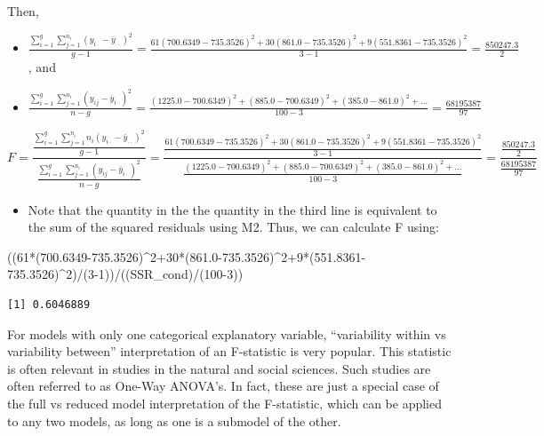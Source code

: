 \documentclass[
  letterpaper,
  DIV=11,
  numbers=noendperiod]{scrreprt}
\newenvironment{Shaded}{\begin{snugshade}}{\end{snugshade}}
\newcommand{\DecValTok}[1]{\textcolor[rgb]{0.68,0.00,0.00}{#1}}
\newcommand{\FloatTok}[1]{\textcolor[rgb]{0.68,0.00,0.00}{#1}}
\newcommand{\NormalTok}[1]{\textcolor[rgb]{0.00,0.23,0.31}{#1}}
\newcommand{\SpecialCharTok}[1]{\textcolor[rgb]{0.37,0.37,0.37}{#1}}
\providecommand{\tightlist}{%
  \setlength{\itemsep}{0pt}\setlength{\parskip}{0pt}}\usepackage{longtable,booktabs,array}
\begin{document}
Then,

\begin{itemize}
\item
  \(\frac{\displaystyle\sum_{i=1}^g\sum_{j=1}^{n_i}(y_{i\cdot}-\bar{y}_{\cdot\cdot})^2}{g-1} = \frac{61(700.6349-735.3526)^2+30(861.0-735.3526)^2+9(551.8361-735.3526)^2}{3-1} = \frac{850247.3}{2}\),
  and
\item
  \(\frac{\displaystyle\sum_{i=1}^g\sum_{j=1}^{n_i}(y_{ij}-\bar{y}_{i\cdot})^2}{n-g} = \frac{(1225.0-700.6349)^2+ (885.0 - 700.6349)^2 + (385.0-861.0)^2+\ldots}{100-3} = \frac{68195387}{97}\)
\end{itemize}

\[
F= \frac{\frac{\displaystyle\sum_{i=1}^g\sum_{j=1}^{n_i}n_i(y_{i\cdot}-\bar{y}_{\cdot\cdot})^2}{g-1}}{\frac{\displaystyle\sum_{i=1}^g\sum_{j=1}^{n_i}(y_{ij}-\bar{y}_{i\cdot})^2}{n-g}} = \frac{\frac{61(700.6349-735.3526)^2+30(861.0-735.3526)^2+9(551.8361-735.3526)^2}{3-1}}{\frac{(1225.0-700.6349)^2+ (885.0 - 700.6349)^2 + (385.0-861.0)^2+\ldots}{100-3}} = \frac{\frac{850247.3}{2}}{\frac{68195387}{97}}
\]

\begin{itemize}
\tightlist
\item
  Note that the quantity in the the quantity in the third line is
  equivalent to the sum of the squared residuals using M2. Thus, we can
  calculate F using:
\end{itemize}

\begin{Shaded}
\begin{Highlighting}[]
\NormalTok{((}\DecValTok{61}\SpecialCharTok{*}\NormalTok{(}\FloatTok{700.6349{-}735.3526}\NormalTok{)}\SpecialCharTok{\^{}}\DecValTok{2}\SpecialCharTok{+}\DecValTok{30}\SpecialCharTok{*}\NormalTok{(}\FloatTok{861.0{-}735.3526}\NormalTok{)}\SpecialCharTok{\^{}}\DecValTok{2}\SpecialCharTok{+}\DecValTok{9}\SpecialCharTok{*}\NormalTok{(}\FloatTok{551.8361{-}735.3526}\NormalTok{)}\SpecialCharTok{\^{}}\DecValTok{2}\NormalTok{)}\SpecialCharTok{/}\NormalTok{(}\DecValTok{3{-}1}\NormalTok{))}\SpecialCharTok{/}\NormalTok{((SSR\_cond)}\SpecialCharTok{/}\NormalTok{(}\DecValTok{100{-}3}\NormalTok{))}
\end{Highlighting}
\end{Shaded}

\begin{verbatim}
[1] 0.6046889
\end{verbatim}

For models with only one categorical explanatory variable, ``variability
within vs variability between'' interpretation of an F-statistic is very
popular. This statistic is often relevant in studies in the natural and
social sciences. Such studies are often referred to as One-Way ANOVA's.
In fact, these are just a special case of the full vs reduced model
interpretation of the F-statistic, which can be applied to any two
models, as long as one is a submodel of the other.
\end{document}
